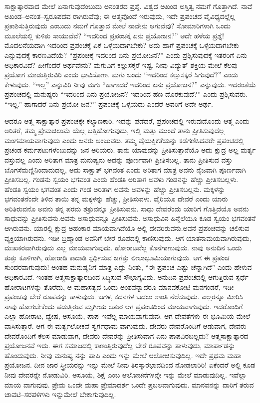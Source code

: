 ಸಾಕ್ಷಾತ್ಕಾರವಾದ ಮೇಲೆ ಏನಾಗುವುದೆಂಬುದು ಅನಂತರದ ಪ್ರಶ್ನೆ. ವಿಶ್ವದ ಅಖಂಡ ಅಸ್ತಿತ್ವ ನಮಗೆ ಗೊತ್ತಾಗಿದೆ. ನಾವೆ ಅಖಂಡ–ಅನಂತ–ಸ್ವರೂಪದವ ರಾಗಿರುವೆವು; ಈ ಆತ್ಮವೊಂದೆ ಇರುವುದು, ಇದೇ ಪ್ರಪಂಚದ ವೈವಿಧ್ಯದಲ್ಲೆಲ್ಲ ಪ್ರಕಾಶಿಸುತ್ತಿರುವುದು ಎಂಬುದು ನಮಗೆ ಗೊತ್ತಾದ ಮೇಲೆ ನಾವೇನು ಆಗುವೆವು? ಸೋಮಾರಿಗಳಾಗಿ ಒಂದು ಮೂಲೆಯಲ್ಲಿ ಕುಳಿತು ಸಾಯುವೆವೆ? “ಇದರಿಂದ ಪ್ರಪಂಚಕ್ಕೆ ಏನು ಪ್ರಯೋಜನ?” ಅದೇ ಹಳೆಯ ಪ್ರಶ್ನೆ! ಮೊದಲನೆಯದಾಗಿ ಇದರಿಂದ ಪ್ರಪಂಚಕ್ಕೆ ಏಕೆ ಒಳ್ಳೆಯದಾಗಬೇಕು? ಅದು ಹಾಗೆ ಪ್ರಪಂಚಕ್ಕೆ ಒಳ್ಳೆಯದಾಗಬೇಕು ಎನ್ನುವುದಕ್ಕೆ ಕಾರಣವಿದೆಯೆ? “ಪ್ರಪಂಚಕ್ಕೆ ಇದರಿಂದ ಏನು ಪ್ರಯೋಜನ?” ಎಂದು ಪ್ರಶ್ನಿಸುವುದಕ್ಕೆ ಇತರರಿಗೆ ಏನು ಅಧಿಕಾರವಿದೆ? ಹೀಗೆಂದರೆ ಅರ್ಥವೇನು? ಮಗುವಿಗೆ ಕಲ್ಲುಸಕ್ಕರೆ ಇಷ್ಟ. ನೀವು ವಿದ್ಯುತ್​ ಶಕ್ತಿಯ ಮೇಲೆ ಕೆಲವು ಪ್ರಯೋಗ ಮಾಡುತ್ತಿರುವಿರಿ ಎಂದು ಭಾವಿಸೋಣ. ಮಗು ಬಂದು “ಇದರಿಂದ ಕಲ್ಲುಸಕ್ಕರೆ ಸಿಗುವುದೆ?” ಎಂದು ಕೇಳುವುದು. “ಇಲ್ಲ” ಎನ್ನುವಿರಿ ನೀವು ಮಗು “ಹಾಗಾದರೆ ಇದರಿಂದ ಏನು ಪ್ರಯೋಜನ?” ಎನ್ನುವುದು. ಇದರಂತೆಯೆ ಪ್ರಪಂಚದಲ್ಲಿ ಮನುಷ್ಯರು “ಇದರಿಂದ ಏನು ಪ್ರಯೋಜನ? ಇದರಿಂದ ಹಣ ದೊರಕುವುದೆ?” ಎಂದು ಪ್ರಶ್ನಿಸುವರು. “ಇಲ್ಲ.” ಹಾಗಾದರೆ ಏನು ಪ್ರಯೋ ಜನ?” ಪ್ರಪಂಚಕ್ಕೆ ಒಳ್ಳೆಯದು ಎಂದರೆ ಅವರಿಗೆ ಅದೇ ಅರ್ಥ.

ಆದರೂ ಆತ್ಮ ಸಾಕ್ಷಾತ್ಕಾರ ಪ್ರಪಂಚಕ್ಕೇ ಕಲ್ಯಾಣಕಾರಿ. ಇದನ್ನು ಪಡೆದರೆ, ಪ್ರಪಂಚದಲ್ಲಿ ಇರುವುದೊಂದು ಆತ್ಮ ಎಂದು ಅರಿತರೆ, ತಮ್ಮ ಪ್ರೇಮಚಿಲುಮೆ ಯೆಲ್ಲ ಬತ್ತಿಹೋಗುವುದು, ಇಲ್ಲಿ ಮತ್ತು ಮುಂದೆ ತಾನು ಪ್ರೀತಿಸುವುದೆಲ್ಲ ಮಂಗಮಾಯವಾಗುವುದು ಎಂದು ಜನರು ಅಂಜುವರು. ತಮ್ಮ ವೈಯಕ್ತಿಕತೆಯನ್ನು ಕಡೆಗಣಿಸಿದವರೇ ಪ್ರಪಂಚದಲ್ಲಿ ಪ್ರಚಂಡ ಕರ್ಮಪಟುಗಳೆಂಬುದನ್ನು ಜನ ಅರಿಯರು. ತಾನು ಯಾವುದನ್ನು ಪ್ರೀತಿಸುತ್ತಾನೆಯೊ ಅದು ಕ್ಷುದ್ರ ಅಲ್ಲ ಮರ್ತ್ಯ ವಸ್ತುವಲ್ಲ ಎಂದು ಅರಿತಾಗ ಮಾತ್ರ ಮನುಷ್ಯನು ಅದನ್ನು ಪೂರ್ಣವಾಗಿ ಪ್ರೀತಿಸಬಲ್ಲ. ತಾನು ಪ್ರೀತಿಸುವ ವಸ್ತು ಬೊಗಸೆಮಣ್ಣಿನಿಂದಾದುದಲ್ಲ, ಅದು ಸಾಕ್ಷಾತ್​ ಭಗವಂತ ಎಂದು ಅರಿತಾಗ ಮಾತ್ರ ಅವನು ನೈಜವಾಗಿ ಪೂರ್ಣವಾಗಿ ಪ್ರೀತಿಸಬಲ್ಲ. ಗಂಡನು ಸ್ವಯಂ ಭಗವಂತ ಎಂದು ಹೆಂಡತಿ ಅರಿತಾಗ ಅವಳು ಗಂಡನನ್ನು ಹೆಚ್ಚು ಪ್ರೀತಿಸಬಲ್ಲಳು. ಹೆಂಡತಿ ಸ್ವಯಂ ಭಗವಂತ ಎಂದು ಗಂಡ ಅರಿತಾಗ ಅವನು ಅವಳನ್ನು ಹೆಚ್ಚು ಪ್ರೀತಿಸಬಲ್ಲನು. ಮಕ್ಕಳನ್ನು ಭಗವಂತನೆಂದೇ ತಿಳಿದ ತಾಯಿ ತನ್ನ ಮಕ್ಕಳನ್ನು ಹೆಚ್ಚು, ಪ್ರೀತಿಸುವಳು. ವೈರಿಯೂ ದೇವರೆ ಎಂದು ಯಾರು ಅರಿತಿರುವನೊ ಅವನು ತನ್ನ ಪರಮ ಶತ್ರುವನ್ನೂ ಪ್ರೀತಿಸುವನು. ಸಾಧು ದೇವರೆಂದು ಯಾರಿಗೆ ಗೊತ್ತಿದೆಯೊ ಅವನು ಸಾಧುವನ್ನು ಪ್ರೀತಿಸುವನು.ಅವನು ಅಸಾಧುವನ್ನೂ ಪ್ರೀತಿಸುವನು. ಅಸಾಧುವಿನ ಹಿನ್ನೆಲೆಯೂ ಕೂಡ ಸ್ವಯಂ ಭಗವಂತನೆ ಆಗಿರುವನು. ಯಾರಲ್ಲಿ ಕ್ಷುದ್ರ ಅಹಂಕಾರ ಮಾಯವಾಗಿದೆಯೊ ಅಲ್ಲಿ ದೇವರಿರುವನು.ಅವನೆ ಪ್ರಪಂಚವನ್ನು ಚಲಿಸುವ ವ್ಯಕ್ತಿಯಾಗಿರುವನು. ಇಡೀ ಬ್ರಹ್ಮಾಂಡ ಅವನಿಗೆ ಬೇರೆ ರೂಪದಲ್ಲಿ ಕಾಣಿಸುವುದು. ಆಗ ಯಾತನಾಮಯವಾಗಿರುವುದು, ದುಃಖಕರವಾಗಿರುವುದು ಎಲ್ಲ ಮಾಯವಾಗುವುದು. ಹೋರಾಟವೆಲ್ಲ ಕೊನೆಗಾಣುವುದು. ನಾವು ಅನುದಿನ ಒಂದು ತುತ್ತು ಕೂಳಿಗಾಗಿ, ಹೋರಾಡಿ ಕಾದಾಡಿ ಸ್ಪರ್ಧಿಸುವ ಜಗತ್ತು ಲೀಲಾಭೂಮಿಯಾಗುವುದು. ಆಗ ಈ ಪ್ರಪಂಚ ಸುಂದರವಾಗುವುದು! ಅಂತಹ ಮನುಷ್ಯನಿಗೆ ಮಾತ್ರ ಎದ್ದು ನಿಂತು, “ಈ ಪ್ರಪಂಚ ಎಷ್ಟು ಚೆನ್ನಾಗಿದೆ” ಎಂದು ಹೇಳುವ ಅಧಿಕಾರವಿದೆ. ಇಂತಹ ಆತ್ಮಸಾಕ್ಷಾತ್ಕಾರದಿಂದ ಸಿದ್ಧಿಸುವ ಸೌಭಾಗ್ಯವಿದು. ಅನುದಿನ ಪ್ರಪಂಚದಲ್ಲಿ ಆಗುತ್ತಿರುವ ಸ್ಪರ್ಧೆ ಹೋರಾಟಗಳನ್ನು ತೊರೆದು, ಆ ಮಹಾಸತ್ಯದ ಒಂದು ಅಂಶವನ್ನಾದರೂ ಮಾನವಕೋಟಿ ಮನಗಂಡರೆ, ಇಡೀ ಪ್ರಪಂಚವು ಬೇರೆ ರೂಪವನ್ನು ತಾಳುವುದು. ಜಗಳ, ಕದನಗಳ ಬದಲು ಶಾಂತಿ ನೆಲೆಸುವುದು. ಎಲ್ಲರನ್ನೂ ಮೀರಿಸಿ ನಾವು ಹೋಗಬೇಕೆಂದು ಪಡುತ್ತಿರುವ ಮೃಗೀಯ ಆತುರ ಆಗ ಪ್ರಪಂಚದಿಂದ ಮಾಯವಾಗುವುದು. ಇದರೊಂದಿಗೆ ಎಲ್ಲಾ ಹೋರಾಟ, ದ್ವೇಷ, ಅಸೂಯೆ, ಪಾಪ–ಇವೆಲ್ಲ ಮಾಯವಾಗುವುವು. ಆಗ ದೇವತೆಗಳು ಈ ಭೂಮಿಯ ಮೇಲೆ ವಾಸಿಸುತ್ತಾರೆ. ಆಗ ಈ ಮರ್ತ್ಯಲೋಕವೆ ಸ್ವರ್ಗಧಾಮ ವಾಗುವುದು. ದೇವರು ದೇವರೊಂದಿಗೆ ಆಡುವಾಗ, ದೇವರು ದೇವರೊಂದಿಗೆ ಕೆಲಸ ಮಾಡುವಾಗ, ದೇವರು ದೇವರನ್ನು ಪ್ರೀತಿಸುವಾಗ ಏನು ಪಾಪವಿರಬಲ್ಲದು? ಆತ್ಮಸಾಕ್ಷಾತ್ಕಾರದ ಪ್ರಯೋಜನವೆ ಇದು. ಈಗ ಸಮಾಜದಲ್ಲಿ ಕಾಣುತ್ತಿರುವುದೆಲ್ಲ ಬೇರೆ ರೂಪವನ್ನು ತಾಳುವುದು, ಮಾರ್ಪಾಡನ್ನು ಹೊಂದುವುದು. ನೀವು ಮನುಷ್ಯ ನನ್ನು ಪಾಪಿ ಎಂದು ಇನ್ನು ಮೇಲೆ ಆಲೋಚಿಸುವುದಿಲ್ಲ. ಇದೇ ಪ್ರಥಮ ಮಹಾ ಪ್ರಯೋಜನ. ದೀನ ಜಾರ ಸ್ತ್ರೀಯರನ್ನು ಇನ್ನು ಮೇಲೆ ನೀವು ತಿರಸ್ಕಾರಭಾವದಿಂದ ನೋಡಲಾರಿರಿ! ಏಕೆಂದರೆ ಅಲ್ಲಿ ಕೂಡ ನೀವು ದೇವರನ್ನೇ ನೋಡುವಿರಿ. ಅಸೂಯೆ, ಶಿಕ್ಷೆ ಎಂಬ ಆಲೋಚನೆಗಳನ್ನೇ ಇನ್ನು ಮೇಲೆ ಮಾಡುವುದಿಲ್ಲ. ಇವೆಲ್ಲಾ ಮಾಯ ವಾಗುವುವು. ಪ್ರೇಮ ಒಂದೇ ಮಹಾ ಪ್ರೇಮಾದರ್ಶ ಒಂದೇ ಪ್ರಬಲವಾಗುವುದು. ಮಾನವನನ್ನು ದಾರಿಗೆ ತರುವ ಚಾವಟಿ–ಸರಪಳಿಗಳು ಇನ್ನುಮೇಲೆ ಬೇಕಾಗುವುದಿಲ್ಲ.

